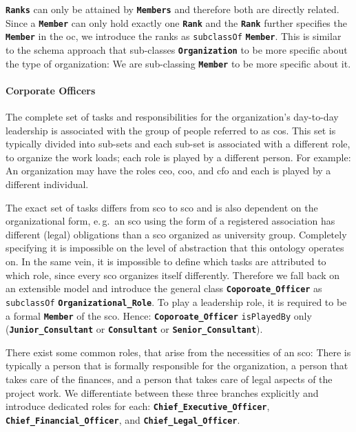 \documentclass[a4paper, DIV=13, BCOR=0cm]{scrbook}
\newcommand{\eg}{e.\,g.\ }
\newcommand{\class}[1]{\texttt{\textbf{#1}}}
\newcommand{\relation}[1]{\texttt{#1}}
\begin{document}
\class{Ranks} can only be attained by \class{Members} and therefore both are directly related. Since a \class{Member} can only hold exactly one \class{Rank} and the \class{Rank} further specifies the \class{Member} in the \gls{oc}, we introduce the ranks as \relation{subclassOf} \class{Member}. This is similar to the \gls{schema} approach that sub-classes \class{Organization} to be more specific about the type of organization: We are sub-classing \class{Member} to be more specific about it.

\paragraph{Corporate Officers}
The complete set of tasks and responsibilities for the organization's day-to-day leadership is associated with the group of people referred to as \glspl{co}. This set is typically divided into sub-sets and each sub-set is associated with a different role, to organize the work loads; each role is played by a different person. For example: An organization may have the roles \gls{ceo}, \gls{coo}, and \gls{cfo} and each is played by a different individual.

The exact set of tasks differs from \gls{sco} to \gls{sco} and is also dependent on the organizational form, \eg an \gls{sco} using the form of a registered association has different (legal) obligations than a \gls{sco} organized as university group. Completely specifying it is  impossible on the level of abstraction that this ontology operates on. In the same vein, it is impossible to define which tasks are attributed to which role, since every \gls{sco} organizes itself differently. Therefore we fall back on an extensible model and introduce the general class \class{Coporoate\_Officer} as \relation{subclassOf} \class{Organizational\_Role}. To play a leadership role, it is required to be a formal \class{Member} of the \gls{sco}. Hence: \class{Coporoate\_Officer} \relation{isPlayedBy} only
(\class{Junior\_Consultant} or \class{Consultant} or \class{Senior\_Consultant}).

There exist some common roles, that arise from the necessities of an \gls{sco}: There is typically a person that is formally responsible for the organization, a person that takes care of the finances, and a person that takes care of legal aspects of the project work. We differentiate between these three branches explicitly and introduce dedicated roles for each: \class{Chief\_Executive\_Officer}, \class{Chief\_Financial\_Officer}, and \class{Chief\_Legal\_Officer}.
\end{document}

